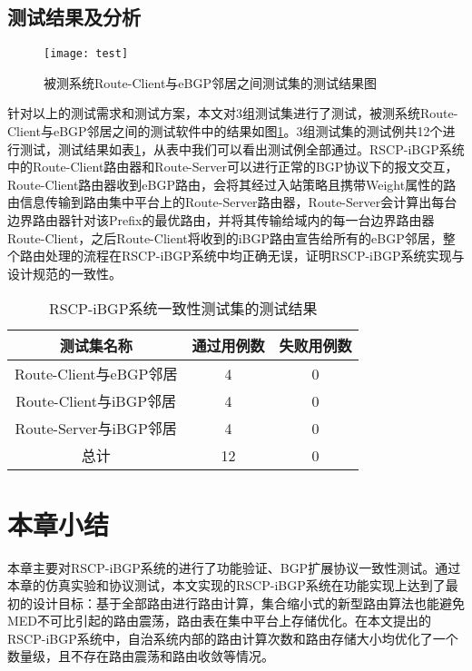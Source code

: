 \subsection{测试结果及分析}


\begin{figure}
  \centering
  \texttt{[image: test]}
  \caption{被测系统Route-Client与eBGP邻居之间测试集的测试结果图}
  \label{fig:test}
\end{figure}


针对以上的测试需求和测试方案，本文对3组测试集进行了测试，被测系统Route-Client与eBGP邻居之间的测试软件中的结果如图\ref{fig:test}。3组测试集的测试例共12个进行测试，测试结果如表\ref{tab:res}，从表中我们可以看出测试例全部通过。RSCP-iBGP系统中的Route-Client路由器和Route-Server可以进行正常的BGP协议下的报文交互，Route-Client路由器收到eBGP路由，会将其经过入站策略且携带Weight属性的路由信息传输到路由集中平台上的Route-Server路由器，Route-Server会计算出每台边界路由器针对该Prefix的最优路由，并将其传输给域内的每一台边界路由器Route-Client，之后Route-Client将收到的iBGP路由宣告给所有的eBGP邻居，整个路由处理的流程在RSCP-iBGP系统中均正确无误，证明RSCP-iBGP系统实现与设计规范的一致性。


\begin{table}[]
\centering
\caption{RSCP-iBGP系统一致性测试集的测试结果}
\label{tab:res}
\begin{tabular}{@{}ccc@{}}
\toprule
测试集名称               & 通过用例数 & 失败用例数 \\ \midrule
Route-Client与eBGP邻居 & 4     & 0     \\
Route-Client与iBGP邻居 & 4     & 0     \\
Route-Server与iBGP邻居 & 4     & 0     \\
总计                  & 12    & 0     \\ \bottomrule
\end{tabular}
\end{table}


\section{本章小结}

本章主要对RSCP-iBGP系统的进行了功能验证、BGP扩展协议一致性测试。通过本章的仿真实验和协议测试，本文实现的RSCP-iBGP系统在功能实现上达到了最初的设计目标：基于全部路由进行路由计算，集合缩小式的新型路由算法也能避免MED不可比引起的路由震荡，路由表在集中平台上存储优化。在本文提出的RSCP-iBGP系统中，自治系统内部的路由计算次数和路由存储大小均优化了一个数量级，且不存在路由震荡和路由收敛等情况。
